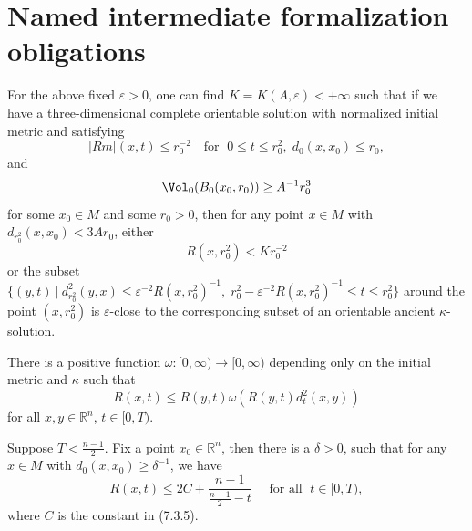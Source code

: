 \section{Named intermediate formalization obligations}
\begin{lemma}
  \label{lem:cz-local-ancient-model-alternative}
For the above fixed $\varepsilon>0$, one can find
$K=K(A,\varepsilon)<+\infty$ such that if we have a
three-dimensional complete orientable solution with normalized
initial metric and satisfying
$$
|Rm|(x,t)\le r_0^{-2}\quad \mbox{for }\; 0\le t\le
r_0^2,\;d_0(x,x_0)\le r_0,
$$
and
$$
\Vol_0(B_0(x_0,r_0))\ge A^{-1}r_0^3
$$
for some $x_0 \in M$ and some $r_0 > 0$, then for any point $x\in
M$ with $d_{r_0^2}(x,x_0)<3Ar_0$, either $$R(x,r_0^2)< Kr_0^{-2}$$
or the subset $\{(y,t)\ |\ d_{r_0^2}^2(y,x)\leq \varepsilon^{-2}
R(x,r_0^2)^{-1},\;r_0^2-\varepsilon^{-2} R(x,r_0^2)^{-1}\le t\le
r_0^2\}$ around the point $(x,r_0^2)$ is $\varepsilon$-close to
the corresponding subset of an orientable ancient
$\kappa$-solution.
\medskip

\end{lemma}
\begin{lemma}
  \label{lem:cz-standard-solution-spatial-curvature-comparison}
There is a positive function
$\omega:[0,\infty)\rightarrow[0,\infty)$ depending only on the
initial metric and $\kappa$ such that
$$
  R(x,t)\leq R(y,t)\omega(R(y,t)d_{t}^{2}(x,y))
$$
for all $x,y\in \mathbb{R}^{n}$, $t\in[0,T)$.
\end{lemma}
\begin{lemma}
  \label{lem:cz-standard-solution-maximal-time-curvature-blowup}
Suppose $T<\frac{n-1}{2}$. Fix a point $x_{0}\in
\mathbb{R}^{n} $, then there is a $\delta>0$, such that for any
$x\in M$ with $d_{0}(x,x_{0})\geq \delta^{-1}$, we have
$$
R(x,t)\leq 2C+\frac{n-1}{\frac{n-1}{2}-t}\quad \text{ for all }\;
t\in[0,T),
$$
where $C$ is the constant in (7.3.5).
\end{lemma}
